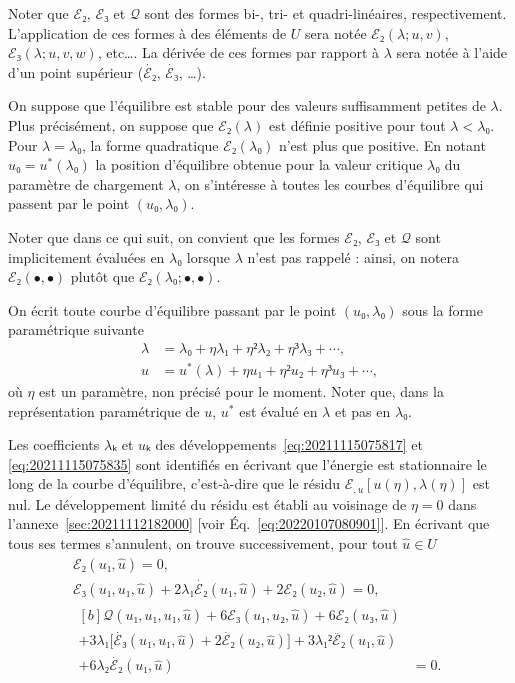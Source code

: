 \documentclass[12pt, final]{amsart}
\begin{document}
Noter que \(ℰ₂\), \(ℰ₃\) et \(𝒬\) sont des formes bi-, tri- et quadri-linéaires,
respectivement. L'application de ces formes à des éléments de \(U\) sera notée
\(ℰ₂(λ; u, v)\), \(ℰ₃(λ; u, v, w)\), etc\dots. La dérivée de ces formes par
rapport à \(λ\) sera notée à l'aide d'un point supérieur (\(\dot{ℰ₂}\),
\(\dot{ℰ₃}\), \dots).

On suppose que l'équilibre est stable pour des valeurs suffisamment petites de
\(λ\). Plus précisément, on suppose que \(ℰ₂(λ)\) est définie positive pour tout
\(λ<λ₀\). Pour \(λ=λ₀\), la forme quadratique \(ℰ₂(λ₀)\) n'est plus que
positive. En notant \(u₀=u^*(λ₀)\) la position d'équilibre obtenue pour la
valeur critique \(λ₀\) du paramètre de chargement \(λ\), on s'intéresse à
toutes les courbes d'équilibre qui passent par le point \((u₀, λ₀)\).

Noter que dans ce qui suit, on convient que les formes \(ℰ₂\), \(ℰ₃\) et \(𝒬\)
sont implicitement évaluées en \(λ₀\) lorsque \(λ\) n'est pas rappelé : ainsi,
on notera \(ℰ₂(•, •)\) plutôt que \(ℰ₂(λ₀; •, •)\).

On écrit toute courbe d'équilibre passant par le point \((u₀, λ₀)\) sous la
forme paramétrique suivante
\begin{align}
  \label{eq:20211115075817}
  λ&=λ₀+ηλ₁+η²λ₂+η³λ₃+\cdots,\\
  \label{eq:20211115075835}
  u&=u^*(λ)+η u₁+η² u₂+η³u₃+\cdots,
\end{align}
où \(η\) est un paramètre, non précisé pour le moment. Noter que, dans la
représentation paramétrique de \(u\), \(u^*\) est évalué en \(λ\) et pas en
\(λ₀\).

Les coefficients \(λ ₖ\) et \(uₖ\) des développements~\eqref{eq:20211115075817}
et \eqref{eq:20211115075835} sont identifiés en écrivant que l'énergie est
stationnaire le long de la courbe d'équilibre, c'est-à-dire que le résidu
\(ℰ_{,u}[u(η), λ(η)]\) est nul. Le développement limité du résidu est établi au
voisinage de \(η=0\) dans l'annexe~\ref{sec:20211112182000} [voir
Éq.~\eqref{eq:20220107080901}]. En écrivant que tous ses termes s'annulent, on
trouve successivement, pour tout \(\hat{u}∈ U\)
\begin{gather}
  \label{eq:20211112182917}
  ℰ₂(u₁, \hat{u})=0,\\
  \label{eq:20211112183220}
  ℰ₃(u₁, u₁, \hat{u})+2λ₁\dot{ℰ₂}(u₁, \hat{u})+2ℰ₂(u₂, \hat{u})=0,\\
  \begin{aligned}[b]
    𝒬(u₁, u₁, u₁, \hat{u})+6ℰ₃(u₁, u₂, \hat{u})+6ℰ₂(u₃, \hat{u})&\\
    +3λ₁\bigl[\dot{ℰ₃}(u₁, u₁, \hat{u})+2\dot{ℰ₂}(u₂, \hat{u})\bigr]
    +3λ₁²\ddot{ℰ₂}(u₁, \hat{u})&\\
    +6λ₂\dot{ℰ₂}(u₁, \hat{u})&=0.
  \end{aligned}
\end{gather}
\end{document}
